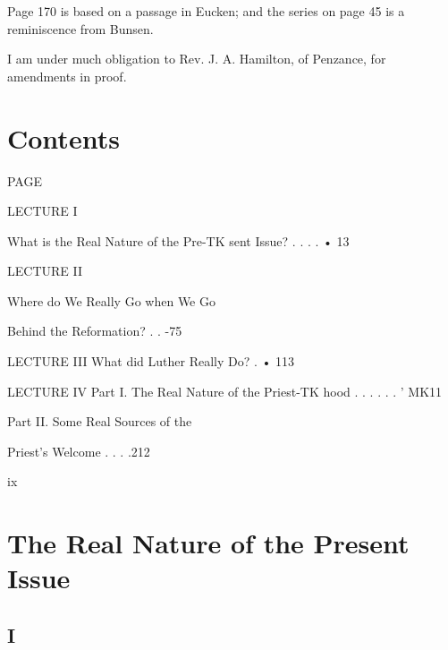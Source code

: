 \documentclass[12pt,a5paper,twoside]{book}
\begin{document}
Page 170 is based on a passage in Eucken; 
and the series on page 45 is a reminiscence 
from Bunsen. 

I am under much obligation to Rev. J. A. 
Hamilton, of Penzance, for amendments in 
proof. 

\chapter*{Contents} 

PAGE 

LECTURE I 

What is the Real Nature of the Pre-TK
sent Issue? . . . . • 13 

LECTURE II 

Where do We Really Go when We Go 

Behind the Reformation? . . -75 

LECTURE III 
What did Luther Really Do? . • 113 

LECTURE IV 
Part I. The Real Nature of the Priest-TK
hood . . . . . . ' MK11 

Part II. Some Real Sources of the 

Priest's Welcome . . . .212 

ix 



\chapter{The Real Nature of the Present Issue}

\section*{I}
\end{document}

